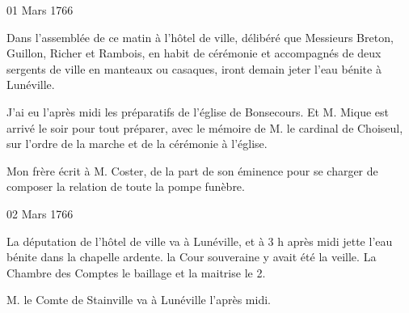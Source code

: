                      \begin{diary}{01 Mars 1766}{}

                         Dans l'assemblée de ce matin à
                              l'hôtel
                              de ville, délibéré que Messieurs
                           Breton, Guillon,
                           Richer et Rambois, en habit de cérémonie
                           et accompagnés de deux sergents de ville
                           en manteaux ou casaques,
                           iront demain
                           jeter l'eau bénite à Lunéville. \bigskip


                         J'ai eu l'après midi les préparatifs
                           de
                           l’église de
                              Bonsecours. Et M. Mique est
                           arrivé le soir pour tout préparer, avec
                           le mémoire de M. le cardinal de Choiseul,
                           sur l'ordre de la marche et de la
                           cérémonie à l’église. \bigskip



                           Mon frère écrit à M.
                              Coster, de la part
                           de son éminence pour se charger de composer
                           la relation de toute la pompe funèbre. \bigskip


                     \end{diary}

                     \begin{diary}{02 Mars 1766}{}

                         La députation de l'hôtel de
                              ville va à Lunéville,
                           et à 3 h après midi jette l'eau bénite dans
                           la chapelle ardente. la Cour
                              souveraine
                           y avait été la veille. La Chambre des Comptes
                           le
                              baillage et la
                              maitrise
                           le 2. \bigskip



                           M. le Comte de Stainville va à
                              Lunéville
                           l'après midi. \bigskip


                     \end{diary}


